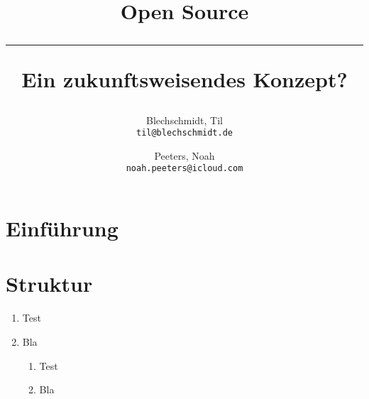 \documentclass[a4paper]{article}
\title{Open Source \\
    \noindent\rule[0.25ex]{\linewidth}{0.5pt}
    \large Ein zukunftsweisendes Konzept?
}
\author{
  Blechschmidt, Til\\
  \texttt{til@blechschmidt.de}
  \and
  Peeters, Noah\\
  \texttt{noah.peeters@icloud.com}
}
\begin{document}
	\thispagestyle{fancy}
	\maketitle
	\clearpage
	
	\section{Einführung}
	   
	\section{Struktur}
	
	\begin{enumerate}
	    \item Test
	    \item Bla
        \begin{enumerate}
        	    \item Test
        	    \item Bla
        	\end{enumerate}
	\end{enumerate}
    
    \clearpage
    \nocite{*}
    
\end{document}
